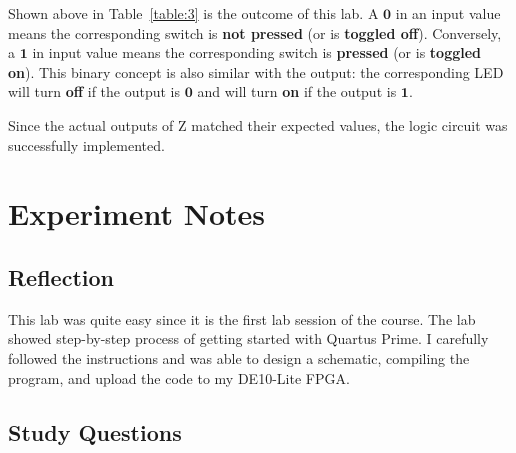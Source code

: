 \documentclass[12pt]{article}
\begin{document}
Shown above in Table~\ref{table:3} is the outcome of this lab. A $\mathbf{0}$ in an input value means the corresponding switch is \textbf{not pressed} (or is \textbf{toggled off}). Conversely, a $\mathbf{1}$ in input value means the corresponding switch is \textbf{pressed} (or is \textbf{toggled on}). This binary concept is also similar with the output: the corresponding LED will turn \textbf{off} if the output is $\mathbf{0}$ and will turn \textbf{on} if the output is $\mathbf{1}$.

Since the actual outputs of Z matched their expected values, the logic circuit was successfully implemented.

\section{Experiment Notes}

\subsection*{Reflection}

This lab was quite easy since it is the first lab session of the course. The lab showed step-by-step process of getting started with Quartus Prime. I carefully followed the instructions and was able to design a schematic, compiling the program, and upload the code to my DE10-Lite FPGA.

\subsection*{Study Questions}
\end{document}
